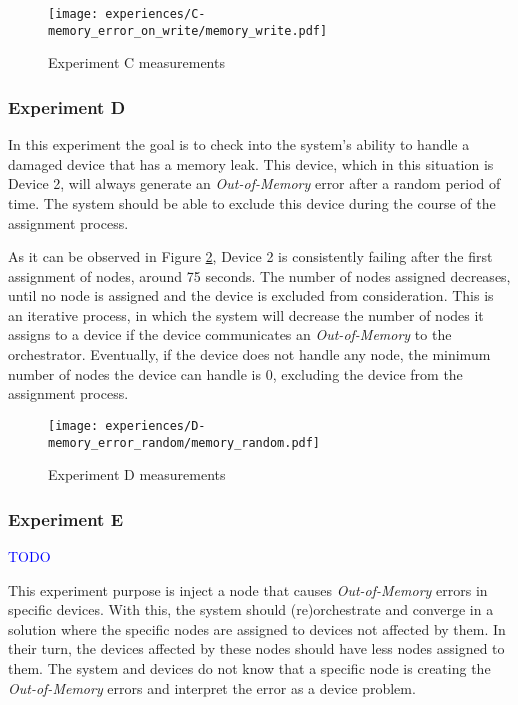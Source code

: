 \begin{figure}[h]
\centering
\texttt{[image: experiences/C-memory\_error\_on\_write/memory\_write.pdf]}
\caption[Experiment C measurements]{Experiment C measurements}\label{fig:experiment_c_graph}
\end{figure}


\subsubsection{Experiment D}

In this experiment the goal is to check into the system's ability to handle a damaged device that has a memory leak. This device, which in this situation is Device 2, will always generate an \textit{Out-of-Memory} error after a random period of time. The system should be able to exclude this device during the course of the assignment process.

As it can be observed in Figure \ref{fig:experiment_d_graph}, Device 2 is consistently failing after the first assignment of nodes, around 75 seconds. The number of nodes assigned decreases, until no node is assigned and the device is excluded from consideration. This is an iterative process, in which the system will decrease the number of nodes it assigns to a device if the device communicates an \textit{Out-of-Memory} to the orchestrator. Eventually, if the device does not handle any node, the minimum number of nodes the device can handle is 0, excluding the device from the assignment process.

\begin{figure}[h]
\centering
\texttt{[image: experiences/D-memory\_error\_random/memory\_random.pdf]}
\caption[Experiment D measurements]{Experiment D measurements}\label{fig:experiment_d_graph}
\end{figure}


\subsubsection{Experiment E}

\textcolor{blue}{TODO}

This experiment purpose is inject a node that causes \textit{Out-of-Memory} errors in specific devices. With this, the system should (re)orchestrate and converge in a solution where the specific nodes are assigned to devices not affected by them. In their turn, the devices affected by these nodes should have less nodes assigned to them. The system and devices do not know that a specific node is creating the \textit{Out-of-Memory} errors and interpret the error as a device problem.

